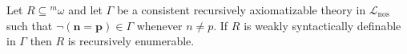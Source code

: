 Let $R \subseteq {}^m\omega$ and let $\Gamma$ be a consistent recursively axiomatizable theory in $\mathcal{L}_{\text{nos}}$ such that $\neg(\mathbf{n} = \mathbf{p}) \in \Gamma$ whenever $n \neq p$. If $R$ is weakly syntactically definable in $\Gamma$ then $R$ is recursively enumerable.
